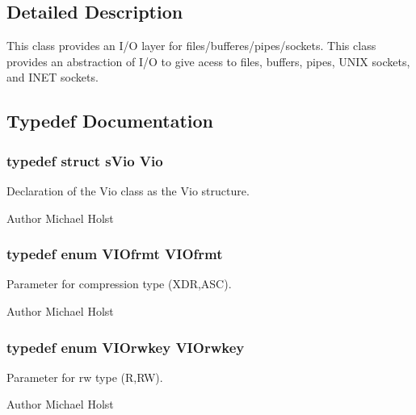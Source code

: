 \subsection{Detailed Description}
This class provides an I/O layer for files/bufferes/pipes/sockets. This class provides an abstraction of I/O to give acess to files, buffers, pipes, UNIX sockets, and INET sockets. 

\subsection{Typedef Documentation}
\subsubsection[{Vio}]{\setlength{\rightskip}{0pt plus 5cm}typedef struct {\bf sVio} {\bf Vio}}\label{a00028_ga277550356f3dd78c988516b1e172a9c6}


Declaration of the Vio class as the Vio structure. 

\begin{DoxyAuthor}{Author}
Michael Holst 
\end{DoxyAuthor}
\subsubsection[{VIOfrmt}]{\setlength{\rightskip}{0pt plus 5cm}typedef enum {\bf VIOfrmt}  {\bf VIOfrmt}}\label{a00028_ga163ab2afe12d8f6739822eac4933da1d}


Parameter for compression type (XDR,ASC). 

\begin{DoxyAuthor}{Author}
Michael Holst 
\end{DoxyAuthor}
\subsubsection[{VIOrwkey}]{\setlength{\rightskip}{0pt plus 5cm}typedef enum {\bf VIOrwkey}  {\bf VIOrwkey}}\label{a00028_ga657e164038235f4739ea0ee41b9e368d}


Parameter for rw type (R,RW). 

\begin{DoxyAuthor}{Author}
Michael Holst 
\end{DoxyAuthor}
